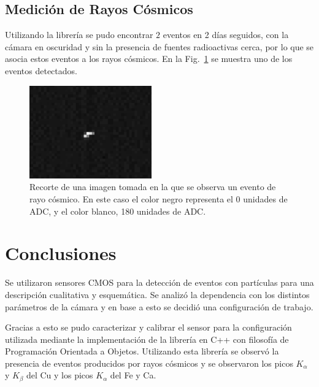 \documentclass[twoside,twocolumn]{article}
\begin{document}
    \subsection{Medición de Rayos Cósmicos}\label{sec:results:cosmic_ray}
      Utilizando la librería se pudo encontrar $2$ %
      eventos en 2 días seguidos, con la cámara en oscuridad y sin la presencia de fuentes radioactivas cerca,
      por lo que se asocia estos eventos a los rayos cósmicos.
      En la Fig.~\ref{fig:cosmic_ray} se muestra uno de los eventos detectados.

      \begin{figure}[
        h]
        \includegraphics[width=0.47\textwidth]{figures/06-04-18_12-25-40.png} %
        \caption{Recorte de una imagen tomada en la que se observa un evento de rayo cósmico.
        En este caso el color negro representa el 0 unidades de ADC, y el color blanco, 180 unidades de ADC.
        }
        \label{fig:cosmic_ray}
      \end{figure}


  \section{Conclusiones}
    Se utilizaron sensores CMOS para la detección de eventos con partículas para una descripción cualitativa y esquemática.
    Se analizó la dependencia con los distintos parámetros de la cámara y en base a esto se decidió una configuración de trabajo.

    Gracias a esto se pudo caracterizar y calibrar el sensor para la configuración utilizada mediante la implementación de la librería
    en C++ con filosofía de Programación Orientada a Objetos.
    Utilizando esta librería se observó la presencia de eventos producidos por rayos cósmicos y
    se observaron los picos $K_{\alpha}$ y $K_{\beta}$ del Cu y los picos $K_{\alpha}$ del Fe y Ca.
\end{document}
